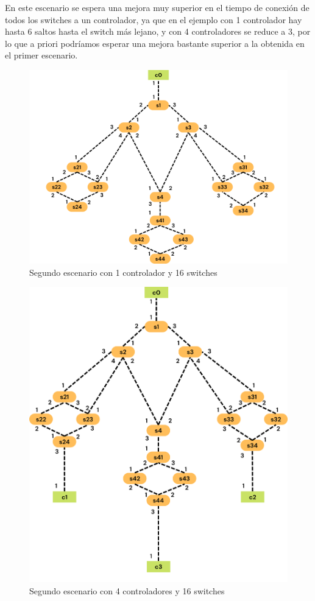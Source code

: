 \documentclass[a4paper, 12pt]{book}
\begin{document}
 	En este escenario se espera una mejora muy superior en el tiempo de conexión de todos los switches a un controlador, ya que en el ejemplo con 1 controlador hay hasta 6 saltos hasta el switch más lejano, y con 4 controladores se reduce a 3, por lo que a priori podríamos esperar una mejora bastante superior a la obtenida en el primer escenario.
 	
 	\begin{figure}[H]
 		\centering
 		\includegraphics[width=14cm, keepaspectratio]{img/escenario2-1}
 		\caption{Segundo escenario con 1 controlador y 16 switches}
 		\label{figura:escenario2-1c}
 	\end{figure}
 	
 	\begin{figure}[H]
 		\centering
 		\includegraphics[width=14cm, keepaspectratio]{img/escenario2-2}
 		\caption{Segundo escenario con 4 controladores y 16 switches}
 		\label{figura:escenario2-4c}
 	\end{figure}
 	
\end{document}

